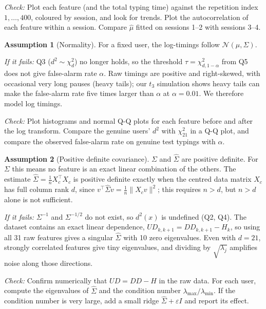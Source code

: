 \documentclass[11pt]{article}
\theoremstyle{definition}
\newtheorem{assumption}{Assumption}
\newcommand{\T}{^{\top}}
\begin{document}
\noindent\textit{Check:} Plot each feature (and the total typing time) against the repetition index $1,\dots,400$, coloured by session, and look for trends. Plot the autocorrelation of each feature within a session. Compare $\hat\mu$ fitted on sessions 1--2 with sessions 3--4.

\begin{assumption}[Normality]\label{as:normal}
For a fixed user, the log-timings follow $\mathcal N(\mu,\Sigma)$.
\end{assumption}
\noindent\textit{If it fails:} Q3 ($d^2\sim\chi^2_d$) no longer holds, so the threshold $\tau=\chi^2_{d,1-\alpha}$ from Q5 does not give false-alarm rate $\alpha$. Raw timings are positive and right-skewed, with occasional very long pauses (heavy tails); our $t_3$ simulation shows heavy tails can make the false-alarm rate five times larger than $\alpha$ at $\alpha=0.01$. We therefore model log timings.

\noindent\textit{Check:} Plot histograms and normal Q-Q plots for each feature before and after the log transform. Compare the genuine users' $d^2$ with $\chi^2_{21}$ in a Q-Q plot, and compare the observed false-alarm rate on genuine test typings with $\alpha$.

\begin{assumption}[Positive definite covariance]\label{as:pd}
$\Sigma$ and $\hat\Sigma$ are positive definite. For $\Sigma$ this means no feature is an exact linear combination of the others. The estimate $\hat\Sigma=\frac1nX_c\T X_c$ is positive definite exactly when the centred data matrix $X_c$ has full column rank $d$, since $v\T\hat\Sigma v=\frac1n\|X_cv\|^2$; this requires $n>d$, but $n>d$ alone is not sufficient.
\end{assumption}
\noindent\textit{If it fails:} $\Sigma^{-1}$ and $\Sigma^{-1/2}$ do not exist, so $d^2(x)$ is undefined (Q2, Q4). The dataset contains an exact linear dependence, $UD_{k,k+1}=DD_{k,k+1}-H_k$, so using all 31 raw features gives a singular $\hat\Sigma$ with 10 zero eigenvalues. Even with $d=21$, strongly correlated features give tiny eigenvalues, and dividing by $\sqrt{\lambda_j}$ amplifies noise along those directions.

\noindent\textit{Check:} Confirm numerically that $UD=DD-H$ in the raw data. For each user, compute the eigenvalues of $\hat\Sigma$ and the condition number $\lambda_{\max}/\lambda_{\min}$. If the condition number is very large, add a small ridge $\hat\Sigma+\varepsilon I$ and report its effect.
\end{document}
